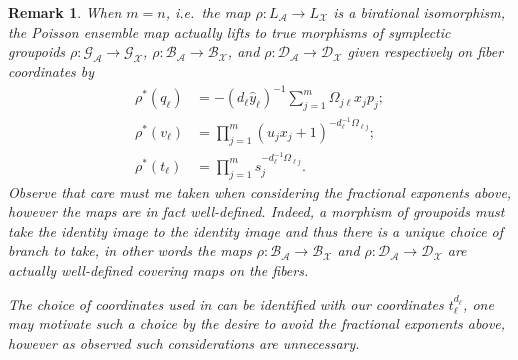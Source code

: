 \documentclass{amsart}
\newtheorem{remark}[theorem]{Remark}
\numberwithin{equation}{section}
\newcommand{\bfr}{{\boldsymbol{r}}}
\newcommand{\cA}{\mathcal{A}}
\newcommand{\cB}{\mathcal{B}}
\newcommand{\cD}{\mathcal{D}}
\newcommand{\cG}{\mathcal{G}}
\newcommand{\cO}{\mathcal{O}}
\newcommand{\cT}{\mathcal{T}}
\newcommand{\cX}{\mathcal{X}}
\newcommand{\CC}{\mathbb{C}}
\newcommand{\RR}{\mathbb{R}}
\newcommand{\rra}{\rightrightarrows}
\begin{document}
\begin{remark}
  \label{rmk:source-connected lift}
  When $m=n$, i.e.\ the map $\rho:L_\cA\to L_\cX$ is a birational isomorphism, the Poisson ensemble map actually lifts to true morphisms of symplectic groupoids $\rho:\cG_\cA\to\cG_\cX$, $\rho:\cB_\cA\to\cB_\cX$, and $\rho:\cD_\cA\to\cD_\cX$ given respectively on fiber coordinates by 
  \begin{align*}
    \rho^*(q_\ell)&=-(d_\ell\hat y_\ell)^{-1}\sum\limits_{j=1}^m\Omega_{j\ell}x_jp_j;\\
    \rho^*(v_\ell)&=\prod\limits_{j=1}^m (u_j x_j + 1)^{-d_\ell^{-1}\Omega_{\ell j}};\\
    \rho^*(t_\ell)&=\prod\limits_{j=1}^m s_j^{-d_\ell^{-1}\Omega_{\ell j}}.
  \end{align*}
  Observe that care must me taken when considering the fractional exponents above, however the maps are in fact well-defined.
  Indeed, a morphism of groupoids must take the identity image to the identity image and thus there is a unique choice of branch to take, in other words the maps $\rho:\cB_\cA\to\cB_\cX$ and $\rho:\cD_\cA\to\cD_\cX$ are actually well-defined covering maps on the fibers.

  The choice of coordinates used in \cite{FG09c} can be identified with our coordinates $t_\ell^{d_\ell}$, one may motivate such a choice by the desire to avoid the fractional exponents above, however as observed such considerations are unnecessary.
\end{remark}


\end{document}
